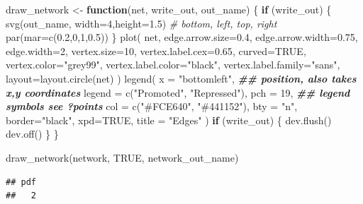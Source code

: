 \documentclass[
]{book}
\newenvironment{Shaded}{\begin{snugshade}}{\end{snugshade}}
\newcommand{\AttributeTok}[1]{\textcolor[rgb]{0.77,0.63,0.00}{#1}}
\newcommand{\CommentTok}[1]{\textcolor[rgb]{0.56,0.35,0.01}{\textit{#1}}}
\newcommand{\ConstantTok}[1]{\textcolor[rgb]{0.00,0.00,0.00}{#1}}
\newcommand{\ControlFlowTok}[1]{\textcolor[rgb]{0.13,0.29,0.53}{\textbf{#1}}}
\newcommand{\DecValTok}[1]{\textcolor[rgb]{0.00,0.00,0.81}{#1}}
\newcommand{\DocumentationTok}[1]{\textcolor[rgb]{0.56,0.35,0.01}{\textbf{\textit{#1}}}}
\newcommand{\FloatTok}[1]{\textcolor[rgb]{0.00,0.00,0.81}{#1}}
\newcommand{\FunctionTok}[1]{\textcolor[rgb]{0.00,0.00,0.00}{#1}}
\newcommand{\NormalTok}[1]{#1}
\newcommand{\OtherTok}[1]{\textcolor[rgb]{0.56,0.35,0.01}{#1}}
\newcommand{\StringTok}[1]{\textcolor[rgb]{0.31,0.60,0.02}{#1}}
\begin{document}
\begin{Shaded}
\begin{Highlighting}[]
\NormalTok{draw\_network }\OtherTok{\textless{}{-}} \ControlFlowTok{function}\NormalTok{(net, write\_out, out\_name) \{}
  \ControlFlowTok{if}\NormalTok{ (write\_out) \{}
    \FunctionTok{svg}\NormalTok{(out\_name, }\AttributeTok{width=}\DecValTok{4}\NormalTok{,}\AttributeTok{height=}\FloatTok{1.5}\NormalTok{)}
    \CommentTok{\# bottom, left, top, right}
    \FunctionTok{par}\NormalTok{(}\AttributeTok{mar=}\FunctionTok{c}\NormalTok{(}\FloatTok{0.2}\NormalTok{,}\DecValTok{0}\NormalTok{,}\DecValTok{1}\NormalTok{,}\FloatTok{0.5}\NormalTok{))}
\NormalTok{  \}}
  \FunctionTok{plot}\NormalTok{(}
\NormalTok{    net,}
    \AttributeTok{edge.arrow.size=}\FloatTok{0.4}\NormalTok{,}
    \AttributeTok{edge.arrow.width=}\FloatTok{0.75}\NormalTok{,}
    \AttributeTok{edge.width=}\DecValTok{2}\NormalTok{,}
    \AttributeTok{vertex.size=}\DecValTok{10}\NormalTok{,}
    \AttributeTok{vertex.label.cex=}\FloatTok{0.65}\NormalTok{,}
    \AttributeTok{curved=}\ConstantTok{TRUE}\NormalTok{,}
    \AttributeTok{vertex.color=}\StringTok{"grey99"}\NormalTok{,}
    \AttributeTok{vertex.label.color=}\StringTok{"black"}\NormalTok{,}
    \AttributeTok{vertex.label.family=}\StringTok{"sans"}\NormalTok{,}
    \AttributeTok{layout=}\FunctionTok{layout.circle}\NormalTok{(net)}
\NormalTok{  )}
  \FunctionTok{legend}\NormalTok{(}
    \AttributeTok{x =} \StringTok{"bottomleft"}\NormalTok{,      }\DocumentationTok{\#\# position, also takes x,y coordinates}
    \AttributeTok{legend =} \FunctionTok{c}\NormalTok{(}\StringTok{"Promoted"}\NormalTok{, }\StringTok{"Repressed"}\NormalTok{),}
    \AttributeTok{pch =} \DecValTok{19}\NormalTok{,              }\DocumentationTok{\#\# legend symbols see ?points}
    \AttributeTok{col =} \FunctionTok{c}\NormalTok{(}\StringTok{"\#FCE640"}\NormalTok{, }\StringTok{"\#441152"}\NormalTok{),}
    \AttributeTok{bty =} \StringTok{"n"}\NormalTok{,}
    \AttributeTok{border=}\StringTok{"black"}\NormalTok{,}
    \AttributeTok{xpd=}\ConstantTok{TRUE}\NormalTok{,}
    \AttributeTok{title =} \StringTok{"Edges"}
\NormalTok{  )}
  \ControlFlowTok{if}\NormalTok{ (write\_out) \{}
    \FunctionTok{dev.flush}\NormalTok{()}
    \FunctionTok{dev.off}\NormalTok{()}
\NormalTok{  \}}
\NormalTok{\}}

\FunctionTok{draw\_network}\NormalTok{(network, }\ConstantTok{TRUE}\NormalTok{, network\_out\_name)}
\end{Highlighting}
\end{Shaded}

\begin{verbatim}
## pdf 
##   2
\end{verbatim}
\end{document}
